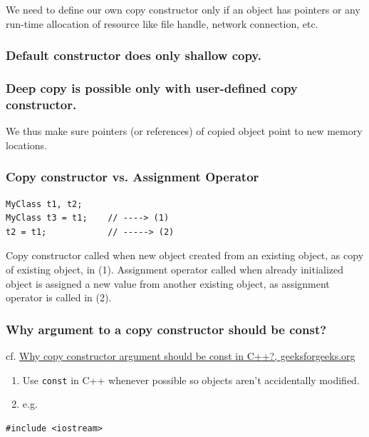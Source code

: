 \documentclass[10pt]{amsart}
\begin{document}
\begin{multicols*}{2}
We need to define our own copy constructor only if an object has pointers or any run-time allocation of resource like file handle, network connection, etc.  

\subsubsection{Default constructor does only shallow copy.}  

\subsubsection{Deep copy is possible only with user-defined copy constructor.}  

We thus make sure pointers (or references) of copied object point to new memory locations.  

\subsubsection{Copy constructor vs. Assignment Operator}  

\begin{lstlisting}  
MyClass t1, t2; 
MyClass t3 = t1; 	// ----> (1)
t2 = t1; 			// -----> (2)
\end{lstlisting}

Copy constructor called when new object created from an existing object, as copy of existing object, in (1).  
Assignment operator called when already initialized object is assigned a new value from another existing object, as assignment operator is called in (2).  

\subsubsection{Why argument to a copy constructor should be const?  } 

cf. \href{http://www.geeksforgeeks.org/copy-constructor-argument-const/}{Why copy constructor argument should be const in C++?, geeksforgeeks.org}

\begin{enumerate}
\item Use \verb|const| in C++ whenever possible so objects aren't accidentally modified.  
\item e.g.  
\end{enumerate}

\begin{lstlisting}  
#include <iostream>  


\end{lstlisting}
\end{multicols*}
\end{document}

